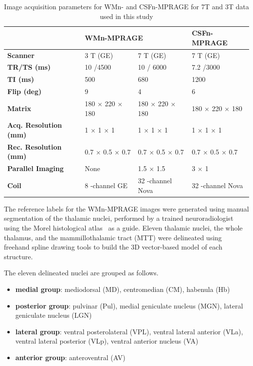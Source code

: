 \begin{table}[]
\centering
\caption{Image acquisition parameters for WMn- and CSFn-MPRAGE for 7T and 3T data used in this study}
\begin{tabular}{llll}
\hline & \multicolumn{2}{l}{\textbf{WMn-MPRAGE}} & \textbf{CSFn-MPRAGE} \\ \hline
\textbf{Scanner } & 3 T (GE) & 7 T (GE) & 7 T (GE) \\
\textbf{TR/TS (ms) } & 10 /4500 & 10 / 6000 & 7.2 /3000 \\
\textbf{TI (ms) } & 500 & 680 & 1200 \\
\textbf{Flip (deg) } & 9 & 4 & 6 \\
\textbf{Matrix } & 180 $\times$ 220 $\times$ 180 & 180 $\times$ 220 $ \times$ 180 & 180 $ \times$ 220 $\times$ 180 \\
\textbf{Acq. Resolution (mm)} & 1 $\times$ 1 $\times$ 1 & 1 $\times$ 1 $ \times$ 1 & 1 $ \times$ 1 $\times$ 1 \\
\textbf{Rec. Resolution (mm)} & 0.7 $\times$ 0.5 $\times$ 0.7 & 0.7 $\times$ 0.5 $ \times$ 0.7 & 0.7 $ \times$ 0.5 $\times$ 0.7 \\
\textbf{Parallel Imaging } & None & 1.5 $\times$ 1.5 & 3 $\times$ 1 \\
\textbf{Coil } & 8 -channel GE & 32 -channel Nova & 32 -channel Nova \\
\hline
\end{tabular}\label{Thalamus.Table.1}
\end{table}

The reference labels for the WMn-MPRAGE images were generated using manual segmentation of the thalamic nuclei, performed by a trained neuroradiologist using the Morel histological atlas~\cite{1921968:27964362} as a guide. Eleven thalamic nuclei, the whole thalamus, and the mammillothalamic tract (MTT) were delineated using freehand spline drawing tools to build the 3D vector-based model of each structure.

The eleven delineated nuclei are grouped as follows.

\begin{itemize}
    \item \relax \textbf{medial group}: mediodorsal (MD), centromedian (CM), habenula (Hb)
    \item \relax \textbf{posterior group}: pulvinar (Pul), medial geniculate nucleus (MGN), lateral geniculate nucleus (LGN)
    \item \relax \textbf{lateral group}: ventral posterolateral (VPL), ventral lateral anterior (VLa), ventral lateral posterior (VLp), ventral anterior nucleus (VA)
    \item \relax \textbf{anterior group}:  anteroventral (AV)
\end{itemize}

